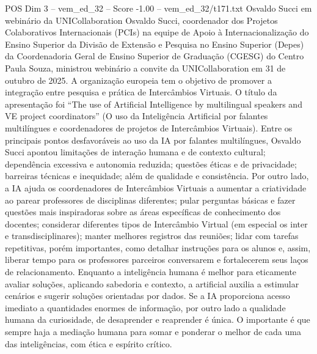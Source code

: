 \begin{textsample}{POS Dim 3 – vem\_ed\_32 – Score -1.00 – vem\_ed\_32/t171.txt}  \label{ex:f3_pos_094}
Osvaldo Succi em webinário da UNICollaboration Osvaldo Succi, coordenador dos Projetos Colaborativos Internacionais (PCIs) na equipe de Apoio à Internacionalização do Ensino Superior da Divisão de Extensão e Pesquisa no Ensino Superior (Depes) da Coordenadoria Geral de Ensino Superior de Graduação (CGESG) do Centro Paula Souza, ministrou webinário a convite da UNICollaboration em 31 de outubro de 2025.
A organização europeia tem o objetivo de promover a integração entre pesquisa e prática de Intercâmbios Virtuais.
O título da apresentação foi “The use of Artificial Intelligence by multilingual speakers and VE project coordinators” (O uso da Inteligência Artificial por falantes multilíngues e coordenadores de projetos de Intercâmbios Virtuais).
Entre os principais pontos desfavoráveis ao uso da IA por falantes multilíngues, Osvaldo Succi apontou limitações de interação humana e de contexto cultural; dependência excessiva e autonomia reduzida; questões éticas e de privacidade; barreiras técnicas e inequidade; além de qualidade e consistência.
Por outro lado, a IA ajuda os coordenadores de Intercâmbios Virtuais a aumentar a criatividade ao parear professores de disciplinas diferentes; pular perguntas básicas e fazer questões mais inspiradoras sobre as áreas específicas de conhecimento dos docentes; considerar diferentes tipos de Intercâmbio Virtual (em especial os inter e transdisciplinares); manter melhores registros das reuniões; lidar com tarefas repetitivas, porém importantes, como detalhar instruções para os alunos e, assim, liberar tempo para os professores parceiros conversarem e fortalecerem seus laços de relacionamento.
Enquanto a inteligência humana é melhor para eticamente avaliar soluções, aplicando sabedoria e contexto, a artificial auxilia a estimular cenários e sugerir soluções orientadas por dados.
Se a IA proporciona acesso imediato a quantidades enormes de informação, por outro lado a qualidade humana da curiosidade, de desaprender e reaprender é única.
O importante é que sempre haja a mediação humana para somar e ponderar o melhor de cada uma das inteligências, com ética e espírito crítico.

\end{textsample}
